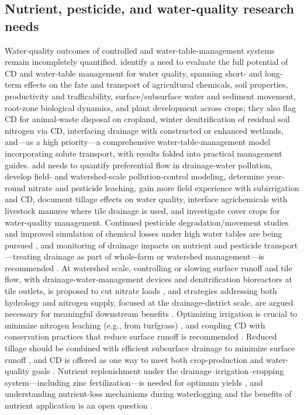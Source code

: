 \subsection{Nutrient, pesticide, and water-quality research needs}
Water-quality outcomes of controlled and water-table-management systems remain incompletely quantified. \textcite{FAUSEY1995} identify a need to evaluate the full potential of CD and water-table management for water quality, spanning short- and long-term effects on the fate and transport of agricultural chemicals, soil properties, productivity and trafficability, surface/subsurface water and sediment movement, root-zone biological dynamics, and plant development across crops; they also flag CD for animal-waste disposal on cropland, winter denitrification of residual soil nitrogen via CD, interfacing drainage with constructed or enhanced wetlands, and---as a high priority---a comprehensive water-table-management model incorporating solute transport, with results folded into practical management guides. \textcite{RITTER1995} add needs to quantify preferential flow in drainage-water pollution, develop field- and watershed-scale pollution-control modeling, determine year-round nitrate and pesticide leaching, gain more field experience with subirrigation and CD, document tillage effects on water quality, interface agrichemicals with livestock manures where tile drainage is used, and investigate cover crops for water-quality management. Continued pesticide degradation/movement studies and improved simulation of chemical losses under high water tables are being pursued \parencite{THOMAS1995}, and monitoring of drainage impacts on nutrient and pesticide transport---treating drainage as part of whole-farm or watershed management---is recommended \parencite{SHIRMOHAMMADI1995}. At watershed scale, controlling or slowing surface runoff and tile flow, with drainage-water-management devices and denitrification bioreactors at tile outlets, is proposed to cut nitrate loads \parencite{Li2015}, and strategies addressing both hydrology and nitrogen supply, focused at the drainage-district scale, are argued necessary for meaningful downstream benefits \parencite{Ikenberry2014}. Optimizing irrigation is crucial to minimize nitrogen leaching (e.g., from turfgrass) \parencite{Filipovic2015}, and coupling CD with conservation practices that reduce surface runoff is recommended \parencite{BinShokrana2023}. Reduced tillage should be combined with efficient subsurface drainage to minimize surface runoff \parencite{Koskiaho2002}, and CD is offered as one way to meet both crop-production and water-quality goals \parencite{Kladivko2005}. Nutrient replenishment under the drainage--irrigation--cropping system---including zinc fertilization---is needed for optimum yields \parencite{Gul2013}, and understanding nutrient-loss mechanisms during waterlogging and the benefits of nutrient application is an open question \parencite{Manik2019}.

